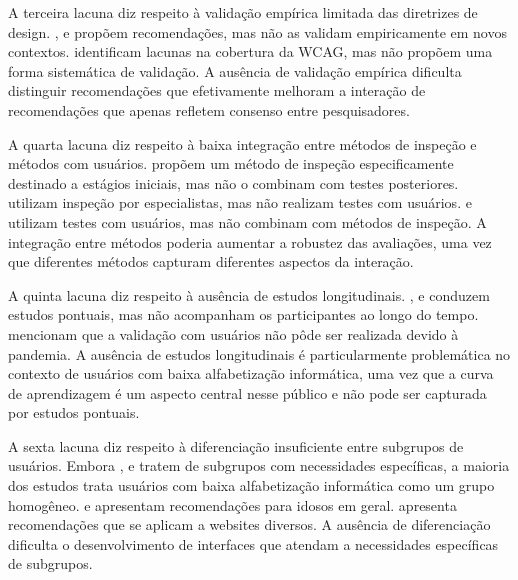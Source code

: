 A terceira lacuna diz respeito à validação empírica limitada das diretrizes de design. \cite{kurniawan2005research}, \cite{sun2010preliminary} e \cite{dombrovskaia2021guideline} propõem recomendações, mas não as validam empiricamente em novos contextos. \cite{wickramathilaka2023addressing} identificam lacunas na cobertura da WCAG, mas não propõem uma forma sistemática de validação. A ausência de validação empírica dificulta distinguir recomendações que efetivamente melhoram a interação de recomendações que apenas refletem consenso entre pesquisadores.

A quarta lacuna diz respeito à baixa integração entre métodos de inspeção e métodos com usuários. \cite{filgueiras2009recoverability} propõem um método de inspeção especificamente destinado a estágios iniciais, mas não o combinam com testes posteriores. \cite{dombrovskaia2021guideline} utilizam inspeção por especialistas, mas não realizam testes com usuários. \cite{gatsou2017seniors} e \cite{xie2010usability} utilizam testes com usuários, mas não combinam com métodos de inspeção. A integração entre métodos poderia aumentar a robustez das avaliações, uma vez que diferentes métodos capturam diferentes aspectos da interação.

A quinta lacuna diz respeito à ausência de estudos longitudinais. \cite{sharit2008information}, \cite{gatsou2017seniors} e \cite{xie2010usability} conduzem estudos pontuais, mas não acompanham os participantes ao longo do tempo. \cite{dombrovskaia2021guideline} mencionam que a validação com usuários não pôde ser realizada devido à pandemia. A ausência de estudos longitudinais é particularmente problemática no contexto de usuários com baixa alfabetização informática, uma vez que a curva de aprendizagem é um aspecto central nesse público e não pode ser capturada por estudos pontuais.

A sexta lacuna diz respeito à diferenciação insuficiente entre subgrupos de usuários. Embora \cite{filgueiras2009recoverability}, \cite{barron2013feasibility} e \cite{gonzalez2025augmenting} tratem de subgrupos com necessidades específicas, a maioria dos estudos trata usuários com baixa alfabetização informática como um grupo homogêneo. \cite{kurniawan2005research} e \cite{sun2010preliminary} apresentam recomendações para idosos em geral. \cite{dombrovskaia2021guideline} apresenta recomendações que se aplicam a websites diversos. A ausência de diferenciação dificulta o desenvolvimento de interfaces que atendam a necessidades específicas de subgrupos.

